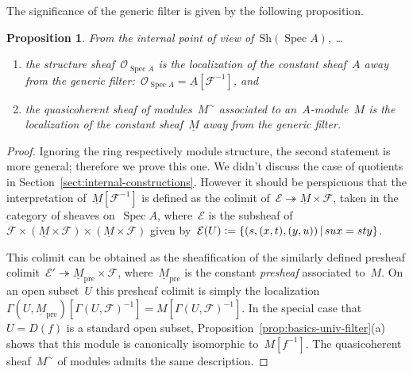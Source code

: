 \documentclass[10pt]{amsart}
\theoremstyle{definition}
\theoremstyle{plain}
\newtheorem{prop}[defn]{Proposition}
\theoremstyle{remark}
\newcommand{\E}{\mathcal{E}}
\newcommand{\F}{\mathcal{F}}
\renewcommand{\O}{\mathcal{O}}
\newcommand{\ul}[1]{\underline{#1}}
\newcommand{\Sh}{\mathrm{Sh}}
\DeclareMathOperator{\Spec}{Spec}
\newcommand{\?}{\,{:}\,}
\renewcommand{\_}{\mathpunct{.}\,}
\newcommand{\defeq}{\vcentcolon=}
\begin{document}
The significance of the generic filter is given by the following proposition.
\begin{prop}From the internal point of view of~$\Sh(\Spec A)$, \ldots
\begin{enumerate}
\item the structure
sheaf~$\O_{\Spec A}$ is the localization of the constant sheaf~$\ul{A}$ away from the
generic filter:~$\O_{\Spec A} = \ul{A}[\F^{-1}]$, and
\item the quasicoherent sheaf of modules~$M^\sim$ associated to
an~$A$-module~$M$ is the localization of the constant sheaf~$\ul{M}$ away from
the generic filter.
\end{enumerate}\end{prop}
\begin{proof}Ignoring the ring respectively module structure, the second
statement is more general; therefore we prove this one. We didn't discuss the
case of quotients in Section~\ref{sect:internal-constructions}. However it
should be perspicuous that the interpretation of~$\ul{M}[\F^{-1}]$ is defined
as the colimit of~$\E \twoheadrightarrow \ul{M} \times \F$, taken in the
category of sheaves on~$\Spec A$, where~$\E$ is the subsheaf of~$\F \times
(\ul{M} \times \F) \times (\ul{M} \times \F)$ given by~$\E(U) \defeq \{
(s,(x,t),(y,u)) \,|\, sux = sty \}$.

This colimit can be obtained as the sheafification of the similarly defined
presheaf colimit~$\E' \twoheadrightarrow \ul{M}_\mathrm{pre} \times \F$,
where~$\ul{M}_\mathrm{pre}$ is the constant \emph{presheaf} associated to~$M$.
On an open subset~$U$ this presheaf colimit is simply the
localization~$\Gamma(U, \ul{M}_\mathrm{pre})[\Gamma(U, \F)^{-1}] = M[\Gamma(U,
\F)^{-1}]$. In the special case that~$U = D(f)$ is a standard open subset,
Proposition~\ref{prop:basics-univ-filter}(a) shows that this module is
canonically isomorphic to~$M[f^{-1}]$. The quasicoherent sheaf~$M^\sim$ of
modules admits the same description.
\end{proof}
\end{document}
